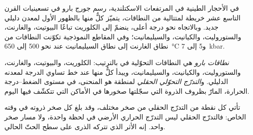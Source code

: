 في الأحجار الطينية في المرتفعات الاسكتلندية، رسم جورج بارو في تسعينيات القرن التاسع عشر خريطة لمتتالية من
النطاقات، يتميّز كلٌّ منها بالظهور الأول لمعدن دليلي جديد. وبالاتجاه نحو درجة
أعلى، ينضمّ إلى الكلوريت تباعًا البيوتيت، والغارنت، والستوروليت، والكيانيت، والسيليمانيت؛
وفي المقاطع النموذجية تكوّنت النطاقات من نطاق الغارنت إلى نطاق السيليمانيت عند نحو 500 إلى
\qty{650}{\celsius} و5 إلى \qty{7}{kbar}.

\begin{definition}\label{def:b2:pt-paths:barrovian}
\emph{نطاقات بارو} هي النطاقات التحوّلية في
 بالترتيب: الكلوريت، والبيوتيت، والغارنت، والستوروليت، والكيانيت، والسيليمانيت،
ويبدأ كلٌّ منها عند خط تساوي الدرجة لمعدنه الدليلي. و\emph{التدرّج التحوّلي
الحقلي} لمنطقة هو المنحنى، في
مستوى الضغط--درجة الحرارة، المارّ بظروف الذروة التي سجّلتها صخورها في
الأماكن التي تتكشّف فيها اليوم.
\end{definition}

تأتي كل نقطة من التدرّج الحقلي من صخر مختلف، وقد بلغ كل صخر ذروته
في وقته الخاص: فالتدرّج الحقلي ليس التدرّج الحراري الأرضي في لحظة واحدة، ولا
مسار صخر واحد. إنه الأثر الذي تتركه الذرى على سطح الحتّ الحالي.

\begin{omfigure}
\centering
{}
\par{}
\end{omfigure}

